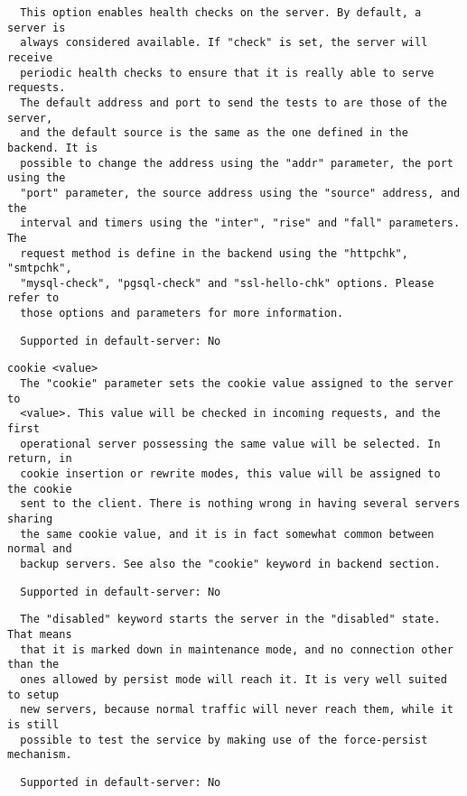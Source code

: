 \begin{verbatim}
  This option enables health checks on the server. By default, a server is
  always considered available. If "check" is set, the server will receive
  periodic health checks to ensure that it is really able to serve requests.
  The default address and port to send the tests to are those of the server,
  and the default source is the same as the one defined in the backend. It is
  possible to change the address using the "addr" parameter, the port using the
  "port" parameter, the source address using the "source" address, and the
  interval and timers using the "inter", "rise" and "fall" parameters. The
  request method is define in the backend using the "httpchk", "smtpchk",
  "mysql-check", "pgsql-check" and "ssl-hello-chk" options. Please refer to
  those options and parameters for more information.
\end{verbatim}

\begin{verbatim}
  Supported in default-server: No
\end{verbatim}

\begin{verbatim}
cookie <value>
  The "cookie" parameter sets the cookie value assigned to the server to
  <value>. This value will be checked in incoming requests, and the first
  operational server possessing the same value will be selected. In return, in
  cookie insertion or rewrite modes, this value will be assigned to the cookie
  sent to the client. There is nothing wrong in having several servers sharing
  the same cookie value, and it is in fact somewhat common between normal and
  backup servers. See also the "cookie" keyword in backend section.
\end{verbatim}

\begin{verbatim}
  Supported in default-server: No
\end{verbatim}

\begin{verbatim}
  The "disabled" keyword starts the server in the "disabled" state. That means
  that it is marked down in maintenance mode, and no connection other than the
  ones allowed by persist mode will reach it. It is very well suited to setup
  new servers, because normal traffic will never reach them, while it is still
  possible to test the service by making use of the force-persist mechanism.
\end{verbatim}

\begin{verbatim}
  Supported in default-server: No
\end{verbatim}

